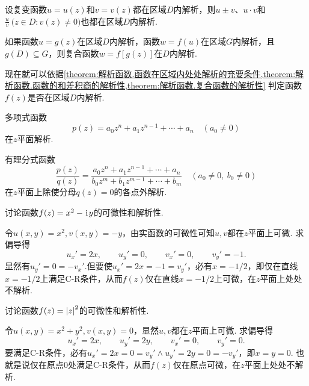\begin{theorem}\label{theorem:解析函数.函数的和差积商的解析性}
设复变函数\(u=u(z)\)和\(v=v(z)\)都在区域\(D\)内解析，则\(u \pm v\)、\(u \cdot v\)和\(\frac{u}{v}\ \bigl( z \in D : v(z) \neq 0 \bigr)\)也都在区域\(D\)内解析.
\end{theorem}

\begin{theorem}\label{theorem:解析函数.复合函数的解析性}
如果函数\(u=g(z)\)在区域\(D\)内解析，函数\(w=f(u)\)在区域\(G\)内解析，且\(g(D) \subseteq G\)，则复合函数\(w=f[g(z)]\)在\(D\)内解析.
\end{theorem}

现在就可以依据\cref{theorem:解析函数.函数在区域内处处解析的充要条件,theorem:解析函数.函数的和差积商的解析性,theorem:解析函数.复合函数的解析性} 判定函数\(f(z)\)是否在区域\(D\)内解析.

\begin{example}
多项式函数\[
p(z) = a_0 z^n + a_1 z^{n-1} + \dotsb + a_n \quad (a_0 \neq 0)
\]在\(z\)平面解析.
\end{example}

\begin{example}
有理分式函数\[
\frac{p(z)}{q(z)} = \frac{a_0 z^n + a_1 z^{n-1} + \dotsb + a_n}{b_0 z^m + b_1 z^{m-1} + \dotsb + b_m} \quad (a_0 \neq 0,\ b_0 \neq 0)
\]在\(z\)平面上除使分母\(q(z)=0\)的各点外解析.
\end{example}

\begin{example}
讨论函数\(f(z) = x^2 - \kern1pt\mathrm{i}\kern1pt y\)的可微性和解析性.
\begin{solution}
令\(u(x,y) = x^2, v(x,y) = -y\)，由实函数的可微性可知\(u,v\)都在\(z\)平面上可微.
求偏导得\[
u_x' = 2x, \qquad u_y' = 0, \qquad v_x' = 0, \qquad v_y' = -1.
\]显然有\(u_y' = 0 = -v_x'\).但要使\(u_x' = 2x = -1 = v_y'\)，必有\(x = -1/2\)，即仅在直线\(x=-1/2\)上满足C-R条件，从而\(f(z)\)仅在直线\(x=-1/2\)上可微，在\(z\)平面上处处不解析.
\end{solution}
\end{example}

\begin{example}
讨论函数\(f(z) = \abs{z}^2\)的可微性和解析性.
\begin{solution}
令\(u(x,y) = x^2 + y^2, v(x,y) = 0\)，显然\(u,v\)都在\(z\)平面上可微.
求偏导得\[
u_x' = 2x, \qquad u_y' = 2y, \qquad v_x' = 0, \qquad v_y' = 0.
\]要满足C-R条件，必有\(u_x' = 2x = 0 = v_y' \land u_y' = 2y = 0 = -v_y'\)，即\(x=y=0\).
也就是说仅在原点0处满足C-R条件，从而\(f(z)\)仅在原点可微，在\(z\)平面上处处不解析.
\end{solution}
\end{example}

